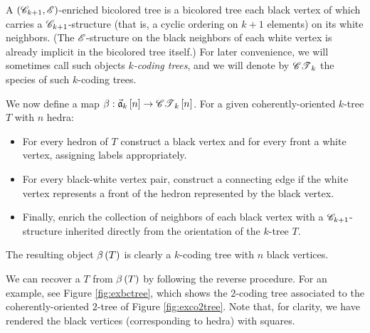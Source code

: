 \documentclass[sectionflow,singlespace,twoside,boldmathhdr]{brandiss} %
\numberwithin{section}{chapter}
\numberwithin{figure}{chapter}
\begin{document}
A $\left( {\mathscr{C}_{k+1}, \mathscr{E}} \right)$-enriched bicolored tree is a bicolored tree each black vertex of which carries a $\mathscr{C}_{k+1}$-structure (that is, a cyclic ordering on $k+1$ elements) on its white neighbors.
(The $\mathscr{E}$-structure on the black neighbors of each white vertex is already implicit in the bicolored tree itself.)
For later convenience, we will sometimes call such objects \emph{$k$-coding trees}, and we will denote by $\mathscr{CT}_{k}$ the species of such $k$-coding trees.

We now define a map $\beta: \vec{\mathfrak{a}}_{k} \left[ {n} \right] \to \mathscr{CT}_{k} \left[ {n} \right]$.
For a given coherently-oriented $k$-tree $T$ with $n$ hedra:
\begin{itemize}
  \item For every hedron of $T$ construct a black vertex and for every front a white vertex, assigning labels appropriately.
  \item For every black-white vertex pair, construct a connecting edge if the white vertex represents a front of the hedron represented by the black vertex.
  \item Finally, enrich the collection of neighbors of each black vertex with a $\mathscr{C}_{k+1}$-structure inherited directly from the orientation of the $k$-tree $T$.
\end{itemize}
The resulting object $\beta \left( {T} \right)$ is clearly a $k$-coding tree with $n$ black vertices.

We can recover a $T$ from $\beta \left( {T} \right)$ by following the reverse procedure.
For an example, see Figure \ref{fig:exbctree}, which shows the $2$-coding tree associated to the coherently-oriented $2$-tree of Figure \ref{fig:exco2tree}.
Note that, for clarity, we have rendered the black vertices (corresponding to hedra) with squares.
\end{document}

